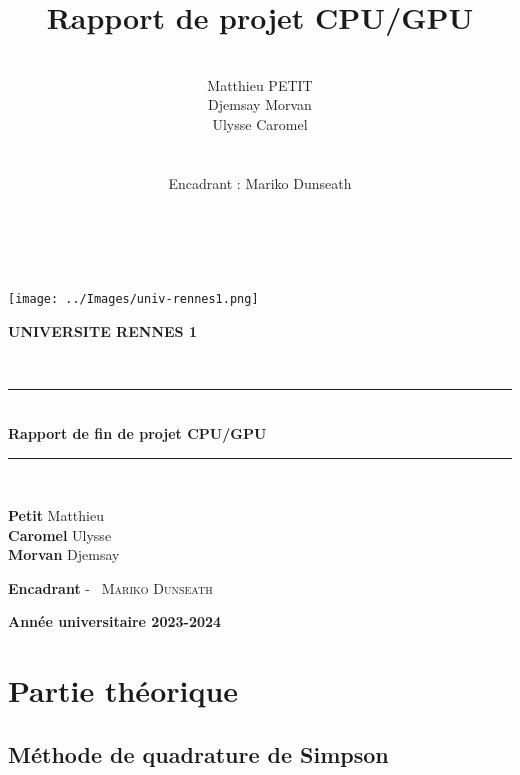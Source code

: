 \documentclass[10pt,a4paper]{article}
\title{Rapport de projet CPU/GPU}
\author{\\Matthieu PETIT\\Djemsay Morvan\\Ulysse Caromel\\\\\\
Encadrant : Mariko Dunseath\\\\\\}
\begin{document}



\begin{titlepage}

    \begin{center}
        \begin{center}
            \texttt{[image: ../Images/univ-rennes1.png]}
            
        \end{center}
        \begin{center}
            \textbf{UNIVERSITE RENNES 1 }
        \end{center}
        \textsc{\Large }\\[2.5cm]
    \rule{\linewidth}{0.3mm} \\[0.4cm]
    { \huge \bfseries Rapport de fin de projet CPU/GPU \\[0.4cm] }
    \rule{\linewidth}{0.3mm} \\[3cm]
    
    
    \noindent
    \begin{center}
        \textbf{Petit} Matthieu\\
        \textbf{Caromel} Ulysse\\
        \textbf{Morvan} Djemsay\\
    \end{center}
        
    \color{black}
    \centering
    \vfill
    \large \textbf{Encadrant} - ~\textsc{Mariko Dunseath} 
    
    \vfill
    
    {\textbf{\large {Année universitaire} 2023-2024}}
    
    \end{center}
\end{titlepage}

\newpage

\tableofcontents

\newpage

\section{Partie théorique}

\subsection{Méthode de quadrature de Simpson}
\end{document}
